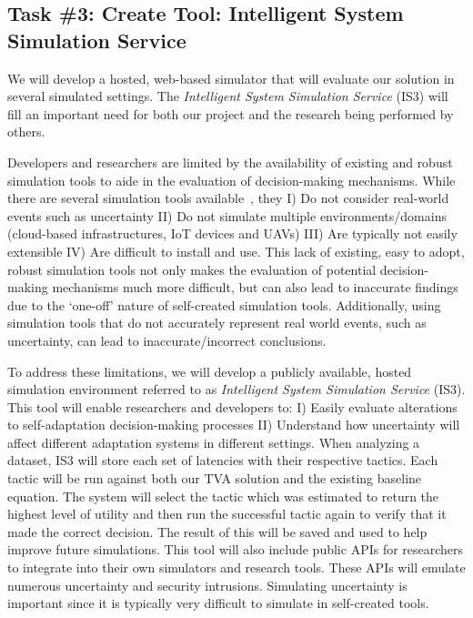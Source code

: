 \documentclass[11pt]{proposalnsf}
\newlength\q %
\begin{document}
\begin{sloppypar}
\subsection*{Task \#3: Create Tool: Intelligent System Simulation Service}
We will develop a hosted, web-based simulator that will evaluate our solution in several simulated settings. The \emph{Intelligent System Simulation Service} (IS3) will fill an important need for both our project and the research being performed by others.

Developers and researchers are limited by the availability of existing and robust simulation tools to aide in the evaluation of decision-making mechanisms. While there are several simulation tools available~\cite{SWIM_URL, OMNet_URL, Rubis_URL}, they I) Do not consider real-world events such as uncertainty II) Do not simulate multiple environments/domains (cloud-based infrastructures, IoT devices and UAVs) III) Are typically not easily extensible IV) Are difficult to install and use. This lack of existing, easy to adopt, robust simulation tools not only makes the evaluation of potential decision-making mechanisms much more difficult, but can also lead to inaccurate findings due to the `one-off' nature of self-created simulation tools. Additionally, using simulation tools that do not accurately represent real world events, such as uncertainty, can lead to inaccurate/incorrect conclusions.



To address these limitations, we will develop a publicly available, hosted simulation environment referred to as \emph{Intelligent System Simulation Service} (IS3). This tool will enable researchers and developers to: I) Easily evaluate alterations to self-adaptation decision-making processes II) Understand how uncertainty will affect different adaptation systems in different settings. When analyzing a dataset, IS3 will store each set of latencies with their respective tactics. Each tactic will be run against both our TVA solution and the existing baseline equation. The system will select the tactic which was estimated to return the highest level of utility and then run the successful tactic again to verify that it made the correct decision. The result of this will be saved and used to help improve future simulations. This tool will also include public APIs for researchers to integrate into their own simulators and research tools. These APIs will emulate numerous uncertainty and security intrusions. Simulating uncertainty is important since it is typically very difficult to simulate in self-created tools.


\end{sloppypar}
\end{document}
